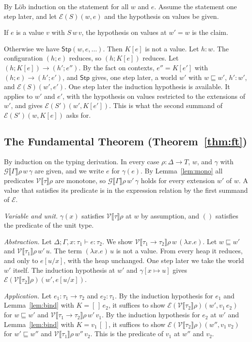\documentclass[acmsmall,nonacm,screen]{acmart}
\newcommand{\sem}[1]{\llbracket #1 \rrbracket}
\newcommand{\Pred}{T}
\newcommand{\Stp}{\mathsf{Stp}}
\newcommand{\Er}{\mathcal{E}}
\newcommand{\Vr}{\mathcal{V}}
\newcommand{\Gr}{\mathcal{G}}
\newcommand{\ext}{\sqsubseteq}
\begin{document}
By L\"ob induction on the statement for all $w$ and $e$. Assume the statement one step later,
and let $\Er(S)(w,e)$ and the hypothesis on values be given.

If $e$ is a value $v$ with $S\,w\,v$, the hypothesis on values at $w' = w$ is the claim.

Otherwise we have $\Stp(w,e,\ldots)$. Then $K[e]$ is not a value. Let $h : w$. The
configuration $(h;e)$ reduces, so $(h;K[e])$ reduces. Let $(h;K[e]) \longrightarrow (h';e'')$.
By the fact on contexts, $e'' = K[e']$ with $(h;e) \longrightarrow (h';e')$, and
$\Stp$ gives, one step later, a world $w'$ with $w \ext w'$, $h' : w'$, and
$\Er(S)(w',e')$. One step later the induction hypothesis is available. It applies to $w'$
and $e'$, with the hypothesis on values restricted to the extensions of $w'$, and gives
$\Er(S')(w',K[e'])$. This is what the second summand of $\Er(S')(w,K[e])$ asks for.

\subsection{The Fundamental Theorem (Theorem~\ref{thm:ft})}

By induction on the typing derivation. In every case $\rho : \Delta \to \Pred$, $w$, and
$\gamma$ with $\Gr\sem{\Gamma}\rho\,w\,\gamma$ are given, and we write $e$ for $\gamma(e)$.
By Lemma~\ref{lem:mono} all predicates $\Vr\sem{\tau}\rho$ are monotone, so
$\Gr\sem{\Gamma}\rho\,w'\,\gamma$ holds for every extension $w'$ of $w$. A value that
satisfies its predicate is in the expression relation by the first summand of $\Er$.

\emph{Variable and unit.} $\gamma(x)$ satisfies $\Vr\sem{\tau}\rho$ at $w$ by assumption,
and $()$ satisfies the predicate of the unit type.

\emph{Abstraction.} Let $\Delta;\Gamma,x{:}\tau_1 \vdash e : \tau_2$. We show
$\Vr\sem{\tau_1 \to \tau_2}\rho\,w\,(\lambda x.e)$. Let $w \ext w'$ and
$\Vr\sem{\tau_1}\rho\,w'\,u$. The term $(\lambda x.e)\,u$ is not a value. From every heap
it reduces, and only to $e[u/x]$, with the heap unchanged. One step later we take the world
$w'$ itself. The induction hypothesis at $w'$ and $\gamma[x \mapsto u]$ gives
$\Er(\Vr\sem{\tau_2}\rho)(w',e[u/x])$.

\emph{Application.} Let $e_1 : \tau_1 \to \tau_2$ and $e_2 : \tau_1$. By the induction
hypothesis for $e_1$ and Lemma~\ref{lem:bind} with $K = [\,]\,e_2$, it suffices to show
$\Er(\Vr\sem{\tau_2}\rho)(w',v_1\,e_2)$ for $w \ext w'$ and
$\Vr\sem{\tau_1 \to \tau_2}\rho\,w'\,v_1$. By the induction hypothesis for $e_2$ at $w'$
and Lemma~\ref{lem:bind} with $K = v_1\,[\,]$, it suffices to show
$\Er(\Vr\sem{\tau_2}\rho)(w'',v_1\,v_2)$ for $w' \ext w''$ and
$\Vr\sem{\tau_1}\rho\,w''\,v_2$. This is the predicate of $v_1$ at $w''$ and $v_2$.
\end{document}
